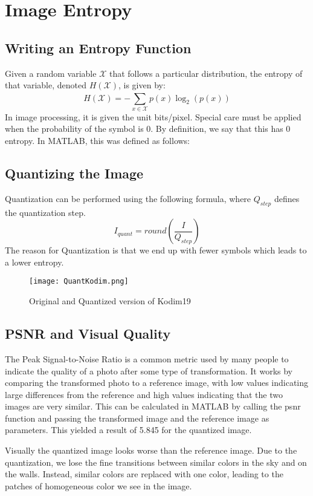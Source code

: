 
\section{Image Entropy}
\subsection{Writing an Entropy Function}
Given a random variable $\mathcal{X}$ that follows a particular distribution, the entropy of that variable, denoted $H(\mathcal{X})$, is given by:
\begin{equation}
    H(\mathcal{X}) = -\sum_{x \in \mathcal{X}}^{} p(x)\log_2(p(x))
\end{equation}
In image processing, it is given the unit bits/pixel. Special care must be applied when the probability of the symbol is 0. By definition, we say that this has 0 entropy. In MATLAB, this was defined as follows:


\subsection{Quantizing the Image}
Quantization can be performed using the following formula, where $Q_{step}$ defines the quantization step.
\begin{equation}
    I_{quant} = round(\frac{I}{Q_{step}})
\end{equation}
The reason for Quantization is that we end up with fewer symbols which leads to a lower entropy. 
\begin{figure}[!h]
    \texttt{[image: QuantKodim.png]}
    \centering
    \caption{Original and Quantized version of Kodim19}
    \label{fig:QuantKodim}
\end{figure}

\subsection{PSNR and Visual Quality}
The Peak Signal-to-Noise Ratio is a common metric used by many people to indicate the quality of a photo after some type of transformation. It works by comparing the transformed photo to a reference image, with low values indicating large differences from the reference and high values indicating that the two images are very similar. This can be calculated in MATLAB by calling the psnr function and passing the transformed image and the reference image as parameters. This yielded a result of 5.845 for the quantized image.

\noindent Visually the quantized image looks worse than the reference image. Due to the quantization, we lose the fine transitions between similar colors in the sky and on the walls. Instead, similar colors are replaced with one color, leading to the patches of homogeneous color we see in the image.

